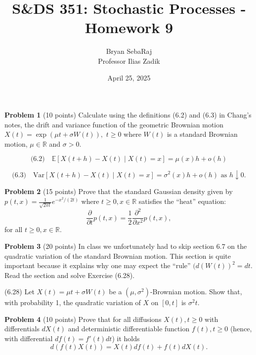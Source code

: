 \documentclass{article}
\title{S\&DS 351: Stochastic Processes - Homework 9}
\author{Bryan SebaRaj \\[0.8em] Professor Ilias Zadik}
\date{April 25, 2025}
\begin{document}
\maketitle

\textbf{Problem 1}   (10 points) Calculate using the definitions (6.2) and (6.3) in Chang’s notes, the drift and variance function of the geometric Brownian motion 
$X(t) = \exp(\mu t + \sigma W(t)),$
$t \geq 0$ where $W(t)$ is a standard Brownian motion, $\mu \in \mathbb{R}$ and $\sigma > 0$.

%
\begin{equation*}
\text{(6.2)} \quad \mathbb{E}[X(t+h) - X(t) \mid X(t) = x] = \mu(x)h + o(h)
\end{equation*}

\begin{equation*}
    \text{(6.3)} \quad \text{Var}[X(t+h) - X(t) \mid X(t) = x] = \sigma^2(x)h + o(h) \text{ as } h \downarrow 0.
\end{equation*}

\textcolor{blue}{
}


\textbf{Problem 2}   (15 points) Prove that the standard Gaussian density given by 
$p(t, x) = \frac{1}{\sqrt{2\pi t}} e^{-x^2/(2t)}$
where $t \geq 0, x \in \mathbb{R}$ satisfies the “heat” equation:
$$\frac{\partial}{\partial t}p(t, x) = \frac{1}{2} \frac{\partial^2}{\partial x^2} p(t, x),$$
for all $t \geq 0, x \in \mathbb{R}$.


\textcolor{blue}{
}



\textbf{Problem 3}   (20 points) In class we unfortunately had to skip section 6.7 on the quadratic variation of the standard Brownian motion. This section is quite important because it explains why one may expect the “rule” 
$(d(W(t))^2 = dt.$
Read the section and solve Exercise (6.28).

(6.28) Let $X(t) = \mu t + \sigma W(t)$ be a $(\mu, \sigma^2)$-Brownian motion. Show that, with probability 1, the quadratic variation of $X$ on $[0, t]$ is $\sigma^2 t$.

\textcolor{blue}{
}



\textbf{Problem 4}   (10 points) Prove that for all diffusions $X(t), t \geq 0$ with differentials $dX(t)$ and deterministic differentiable function $f(t), t \geq 0$ (hence, with differential $df(t) = f'(t)dt$) it holds
$$d(f(t)X(t)) = X(t)df(t) + f(t)dX(t).$$
\end{document}
